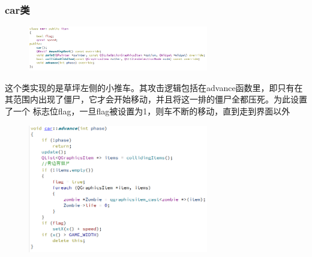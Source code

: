 \documentclass[12pt,a4paper,UTF8]{article}
\begin{document}
    \subsubsection{car类}
    \begin{figure}[H]
      \centering
    \includegraphics[width=0.7\textwidth]{figure/car.png}
    \end{figure}
    这个类实现的是草坪左侧的小推车。其攻击逻辑包括在advance函数里，即只有在其范围内出现了僵尸，它才会开始移动，并且将这一排的僵尸全都压死。为此设置了一个
    标志位flag，一旦flag被设置为1，则车不断的移动，直到走到界面以外
    \begin{figure}[H]
      \centering
    \includegraphics[width=0.7\textwidth]{figure/carAdvance.png}
    \end{figure}
\end{document}
